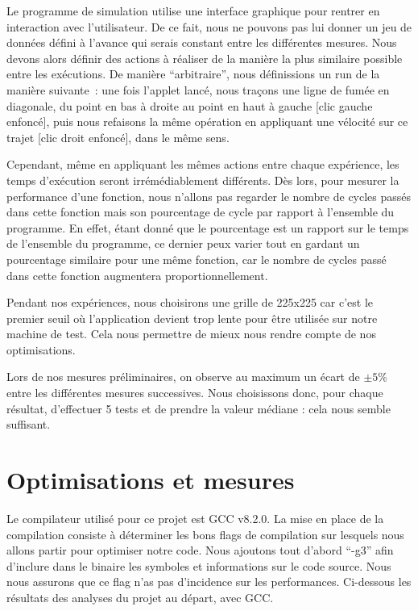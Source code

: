 \documentclass[12pt,a4paper]{article}
\begin{document}
Le programme de simulation utilise une interface graphique pour rentrer en
interaction avec l’utilisateur. De ce fait, nous ne pouvons pas lui donner un
jeu de données défini à l’avance qui serais constant entre les différentes
mesures. Nous devons alors définir des actions à réaliser de la manière la plus
similaire possible entre les exécutions. De manière \enquote{arbitraire}, nous
définissions un run de la manière suivante : une fois l’applet lancé, nous
traçons une ligne de fumée en diagonale, du point en bas à droite au point en
haut à gauche [clic gauche enfoncé], puis nous refaisons la même opération en
appliquant une vélocité sur ce trajet [clic droit enfoncé], dans le même sens.

Cependant, même en appliquant les mêmes actions entre chaque expérience, les
temps d’exécution seront irrémédiablement différents. Dès lors, pour mesurer la
performance d’une fonction, nous n’allons pas regarder le nombre de cycles
passés dans cette fonction mais son pourcentage de cycle par rapport à
l’ensemble du programme. En effet, étant donné que le pourcentage est un rapport
sur le temps de l’ensemble du programme, ce dernier peux varier tout en gardant
un pourcentage similaire pour une même fonction, car le nombre de cycles passé
dans cette fonction augmentera proportionnellement.

Pendant nos expériences, nous choisirons une grille de 225x225 car c’est le
premier seuil où l’application devient trop lente pour être utilisée sur notre
machine de test. Cela nous permettre de mieux nous rendre compte de nos
optimisations.

Lors de nos mesures préliminaires, on observe au maximum un écart de $\pm 5 \%$
entre les différentes mesures successives. Nous choisissons donc, pour chaque
résultat, d’effectuer 5 tests et de prendre la valeur médiane : cela nous semble
suffisant.

\section{Optimisations et mesures}
\label{sec.optim}

Le compilateur utilisé pour ce projet est \ac{GCC} v8.2.0. La mise en place de
la compilation consiste à déterminer les bons flags de compilation sur lesquels
nous allons partir pour optimiser notre code. Nous ajoutons tout d’abord
\enquote{-g3} afin d’inclure dans le binaire les symboles et informations sur le
code source. Nous nous assurons que ce flag n’as pas d’incidence sur les
performances. Ci-dessous les résultats des analyses du projet au départ, avec
\ac{GCC}.
\end{document}
